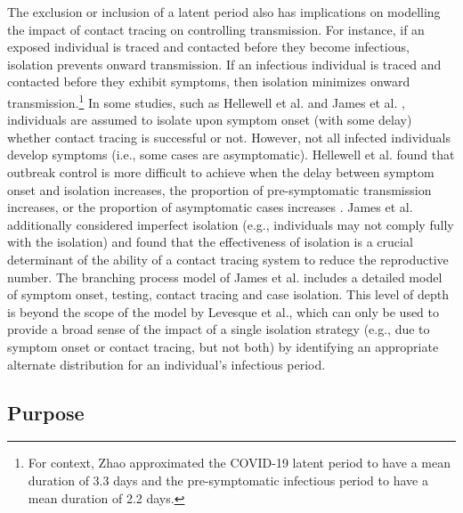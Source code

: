 \documentclass[sr]{drdc-report}
\begin{document}
The exclusion or inclusion of a latent period also has implications on modelling the impact of contact tracing on controlling transmission. For instance, if an exposed individual is traced and contacted before they become infectious, isolation prevents onward transmission. If an infectious individual is traced and contacted before they exhibit symptoms, then isolation minimizes onward transmission.{\footnote{For context, Zhao \cite{Zhao} approximated the COVID-19 latent period to have a mean duration of 3.3 days and the pre-symptomatic infectious period to have a mean duration of 2.2 days.}} In some studies, such as Hellewell et al. \cite{Hellewell} and James et al. \cite{James}, individuals are assumed to isolate upon symptom onset (with some delay) whether contact tracing is successful or not. However, not all infected individuals develop symptoms (i.e., some cases are asymptomatic).{\footnotemark} Hellewell et al. \cite{Hellewell} found that outbreak control is more difficult to achieve when the delay between symptom onset and isolation increases, the proportion of pre-symptomatic transmission increases, or the proportion of asymptomatic cases increases \cite{Hellewell}. James et al. \cite{James} additionally considered imperfect isolation (e.g., individuals may not comply fully with the isolation) and found that the effectiveness of isolation is a crucial determinant of the ability of a contact tracing system to reduce the reproductive number. The branching process model of James et al. \cite{James} includes a detailed model of symptom onset, testing, contact tracing and case isolation. This level of depth is beyond the scope of the model by Levesque et al., which can only be used to provide a broad sense of the impact of a single isolation strategy (e.g., due to symptom onset or contact tracing, but not both) by identifying an appropriate alternate distribution for an individual’s infectious period. 



 

\subsection{Purpose} 

 
\end{document}
